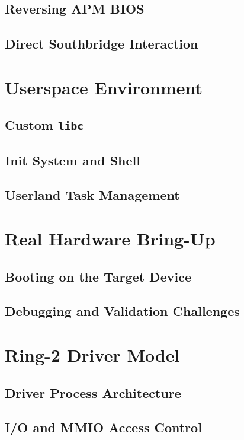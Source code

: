 \documentclass[12pt,a4paper]{report}
\begin{document}
	\section{Reversing APM BIOS}
	
	\section{Direct Southbridge Interaction}
	
	\chapter{Userspace Environment}
	\section{Custom \texttt{libc}}
	
	\section{Init System and Shell}
	
	\section{Userland Task Management}
	
	\chapter{Real Hardware Bring-Up}
	\section{Booting on the Target Device}
	
	\section{Debugging and Validation Challenges}
	
	\chapter{Ring-2 Driver Model}
	\section{Driver Process Architecture}
	
	\section{I/O and MMIO Access Control}
	
\end{document}
